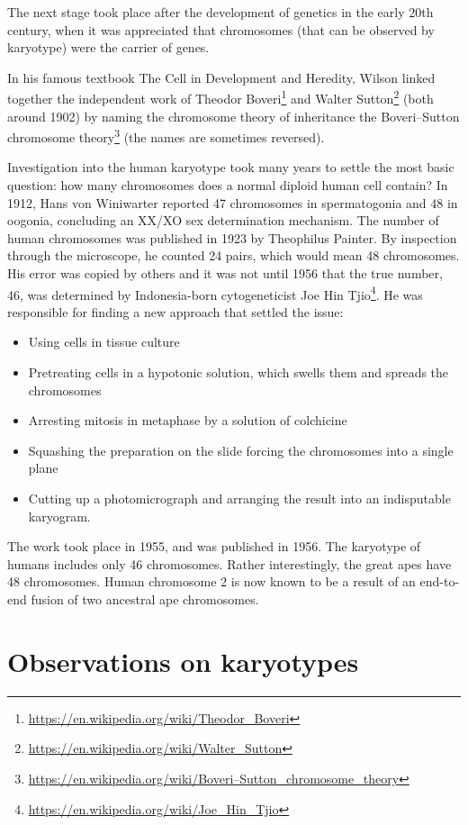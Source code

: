 \documentclass[]{book}
\providecommand{\tightlist}{%
  \setlength{\itemsep}{0pt}\setlength{\parskip}{0pt}}
\let\rmarkdownfootnote\footnote%
\def\footnote{\protect\rmarkdownfootnote}
\renewcommand{\href}[2]{#2\footnote{\url{#1}}}
\begin{document}
The next stage took place after the development of genetics in the early
20th century, when it was appreciated that chromosomes (that can be
observed by karyotype) were the carrier of genes.

In his famous textbook The Cell in Development and Heredity, Wilson
linked together the independent work of
\href{https://en.wikipedia.org/wiki/Theodor_Boveri}{Theodor Boveri} and
\href{https://en.wikipedia.org/wiki/Walter_Sutton}{Walter Sutton} (both
around 1902) by naming the chromosome theory of inheritance the
\href{https://en.wikipedia.org/wiki/Boveri–Sutton_chromosome_theory}{Boveri--Sutton
chromosome theory} (the names are sometimes reversed).

Investigation into the human karyotype took many years to settle the
most basic question: how many chromosomes does a normal diploid human
cell contain? In 1912, Hans von Winiwarter reported 47 chromosomes in
spermatogonia and 48 in oogonia, concluding an XX/XO sex determination
mechanism. The number of human chromosomes was published in 1923 by
Theophilus Painter. By inspection through the microscope, he counted 24
pairs, which would mean 48 chromosomes. His error was copied by others
and it was not until 1956 that the true number, 46, was determined by
Indonesia-born cytogeneticist
\href{https://en.wikipedia.org/wiki/Joe_Hin_Tjio}{Joe Hin Tjio}. He was
responsible for finding a new approach that settled the issue:

\begin{itemize}
\tightlist
\item
  Using cells in tissue culture
\item
  Pretreating cells in a hypotonic solution, which swells them and
  spreads the chromosomes
\item
  Arresting mitosis in metaphase by a solution of colchicine
\item
  Squashing the preparation on the slide forcing the chromosomes into a
  single plane
\item
  Cutting up a photomicrograph and arranging the result into an
  indisputable karyogram.
\end{itemize}

The work took place in 1955, and was published in 1956. The karyotype of
humans includes only 46 chromosomes. Rather interestingly, the great
apes have 48 chromosomes. Human chromosome 2 is now known to be a result
of an end-to-end fusion of two ancestral ape chromosomes.

\section{Observations on karyotypes}\label{observations-on-karyotypes}
\end{document}

